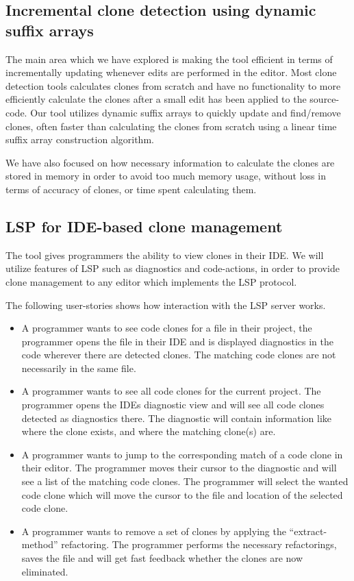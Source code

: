 \subsection{Incremental clone detection using dynamic suffix arrays}

The main area which we have explored is making the tool efficient in terms of
incrementally updating whenever edits are performed in the editor. Most clone detection
tools calculates clones from scratch and have no functionality to more efficiently
calculate the clones after a small edit has been applied to the source-code. Our tool
utilizes dynamic suffix arrays to quickly update and find/remove clones, often faster than
calculating the clones from scratch using a linear time suffix array construction
algorithm.

We have also focused on how necessary information to calculate the clones are stored in
memory in order to avoid too much memory usage, without loss in terms of accuracy of
clones, or time spent calculating them.

\subsection{LSP for IDE-based clone management}

The tool gives programmers the ability to view clones in their IDE. We will utilize
features of LSP such as diagnostics and code-actions, in order to provide clone management
to any editor which implements the LSP protocol.

The following user-stories shows how interaction with the LSP server works.

\begin{itemize}
	\item A programmer wants to see code clones for a file in their project, the
	      programmer opens the file in their IDE and is displayed diagnostics in the code
	      wherever there are detected clones. The matching code clones are not necessarily
	      in the same file.

	\item A programmer wants to see all code clones for the current project. The
	      programmer opens the IDEs diagnostic view and will see all code clones detected
	      as diagnostics there. The diagnostic will contain information like where the clone
	      exists, and where the matching clone(s) are.

	\item A programmer wants to jump to the corresponding match of a code clone in their
	      editor. The programmer moves their cursor to the diagnostic and will see a list of
	      the matching code clones. The programmer will select the wanted code clone which
	      will move the cursor to the file and location of the selected code clone.

      \item A programmer wants to remove a set of clones by applying the
          ``extract-method'' refactoring. The programmer performs the necessary
          refactorings, saves the file and will get fast feedback whether the
          clones are now eliminated.
\end{itemize}

